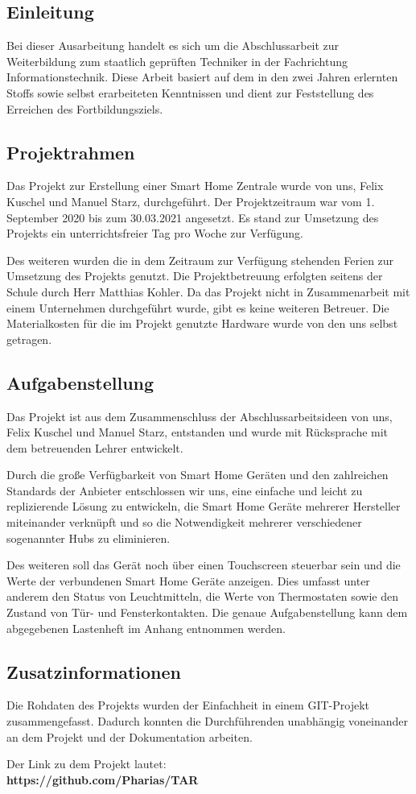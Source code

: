 \documentclass[12pt,a4paper]{article}
\begin{document}
 	\subsection{Einleitung}
 	Bei dieser Ausarbeitung handelt es sich um die Abschlussarbeit zur Weiterbildung zum staatlich geprüften Techniker in der Fachrichtung Informationstechnik. Diese Arbeit basiert auf dem in den zwei Jahren erlernten Stoffs sowie selbst erarbeiteten Kenntnissen und dient zur Feststellung des Erreichen des Fortbildungsziels.
 	\subsection{Projektrahmen}
 	Das Projekt zur Erstellung einer Smart Home Zentrale wurde von uns, Felix Kuschel und Manuel Starz, durchgeführt. Der Projektzeitraum war vom 1. September 2020 bis zum 30.03.2021 angesetzt. Es stand zur Umsetzung des Projekts ein unterrichtsfreier Tag pro Woche zur Verfügung.\par
 	Des weiteren wurden die in dem Zeitraum zur Verfügung stehenden Ferien zur Umsetzung des Projekts genutzt. Die Projektbetreuung erfolgten seitens der Schule durch Herr Matthias Kohler. Da das Projekt nicht in Zusammenarbeit mit einem Unternehmen durchgeführt wurde, gibt es keine weiteren Betreuer. Die Materialkosten für die im Projekt genutzte Hardware wurde von den uns selbst getragen.
 	\subsection{Aufgabenstellung}
 	Das Projekt ist aus dem Zusammenschluss der Abschlussarbeitsideen von uns, Felix Kuschel und Manuel Starz, entstanden und wurde mit Rücksprache mit dem betreuenden Lehrer entwickelt.\par
 	 Durch die große Verfügbarkeit von Smart Home Geräten und den zahlreichen Standards der Anbieter entschlossen wir uns, eine einfache und leicht zu replizierende Lösung zu entwickeln, die Smart Home Geräte mehrerer Hersteller miteinander verknüpft und so die Notwendigkeit mehrerer verschiedener sogenannter Hubs zu eliminieren. \par
 	Des weiteren soll das Gerät noch über einen Touchscreen steuerbar sein und die Werte der verbundenen Smart Home Geräte anzeigen. Dies umfasst unter anderem den Status von Leuchtmitteln, die Werte von Thermostaten sowie den Zustand von Tür- und Fensterkontakten. Die genaue Aufgabenstellung kann dem abgegebenen Lastenheft im Anhang entnommen werden.
 	\subsection{Zusatzinformationen}
 	Die Rohdaten des Projekts wurden der Einfachheit in einem GIT-Projekt zusammengefasst. Dadurch konnten die Durchführenden unabhängig voneinander an dem Projekt und der Dokumentation arbeiten.\par
 	Der Link zu dem Projekt lautet:\\
 	\textbf{https://github.com/Pharias/TAR}
 	\newpage
\end{document}

